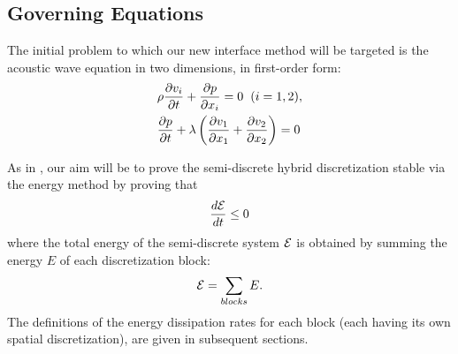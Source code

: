 
\subsection{Governing Equations}

The initial problem to which our new interface method will be targeted is
the acoustic wave equation in two dimensions, in first-order form:
\begin{align}
	&\rho \frac{\partial v_{i}}{\partial t} + \frac{\partial p}{\partial x_{i}} = 0 \hspace{2mm} (i = 1, 2), \label{eq:wave1} \\
	&\frac{\partial p}{\partial t} + \lambda \left(\frac{\partial v_{1}}{\partial x_{1}} + \frac{\partial v_{2}}{\partial x_{2}} \right) = 0 \label{eq:wave2}
\end{align}

As in \cite{kozdon2016stable}, our aim will be to prove the semi-discrete hybrid discretization
stable via the energy method by proving that
\begin{align}
\frac{d\mathcal{E}}{dt} \leq 0
\end{align}
where the total energy of the semi-discrete system $\mathcal{E}$ is obtained by summing the
energy $E$ of each discretization block:
\begin{align}
\mathcal{E} = \sum_{blocks} E.
\end{align}
The definitions of the energy dissipation rates for each
block (each having its own spatial discretization), are given in subsequent
sections.

